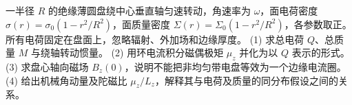 一半径 \(R\) 的绝缘薄圆盘绕中心垂直轴匀速转动，角速率为 \(\omega\)，面电荷密度 \(\sigma(r)=\sigma_0(1-r^2/R^2)\)，面质量密度 \(\Sigma(r)=\Sigma_0(1-r^2/R^2)\)，各参数取正。所有电荷固定在盘面上，忽略辐射、外加场和边缘厚度。
(1) 求总电荷 \(Q\)、总质量 \(M\) 与绕轴转动惯量。
(2) 用环电流积分磁偶极矩 \(\mu_z\) 并化为以 \(Q\) 表示的形式。
(3) 求盘心轴向磁场 \(B_z(0)\)，说明不能把非均匀带电盘等效为一个边缘电流圈。
(4) 给出机械角动量及陀磁比 \(\mu_z/L_z\)，解释其与电荷及质量的同分布假设之间的关系。

